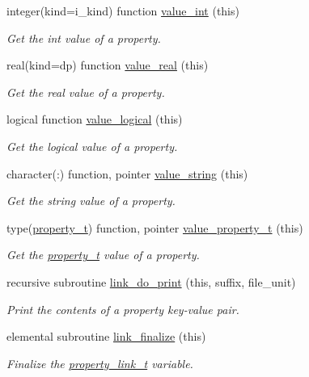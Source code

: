 \begin{DoxyCompactItemize}
integer(kind=i\+\_\+kind) function \mbox{\hyperlink{namespacepmc__property_a5f75da984050d4621460b7530f4edb11}{value\+\_\+int}} (this)
\begin{DoxyCompactList}\small\item\em Get the int value of a property. \end{DoxyCompactList}\item 
real(kind=dp) function \mbox{\hyperlink{namespacepmc__property_a0ef35a2bc42efede42972be617c65e27}{value\+\_\+real}} (this)
\begin{DoxyCompactList}\small\item\em Get the real value of a property. \end{DoxyCompactList}\item 
logical function \mbox{\hyperlink{namespacepmc__property_a404e309153854ccab86eb10318fcbdcf}{value\+\_\+logical}} (this)
\begin{DoxyCompactList}\small\item\em Get the logical value of a property. \end{DoxyCompactList}\item 
character(\+:) function, pointer \mbox{\hyperlink{namespacepmc__property_ad5dcdbd8450ec28999baff573c4edada}{value\+\_\+string}} (this)
\begin{DoxyCompactList}\small\item\em Get the string value of a property. \end{DoxyCompactList}\item 
type(\mbox{\hyperlink{structpmc__property_1_1property__t}{property\+\_\+t}}) function, pointer \mbox{\hyperlink{namespacepmc__property_a793853ad03f64d47abf8df8d637e53c6}{value\+\_\+property\+\_\+t}} (this)
\begin{DoxyCompactList}\small\item\em Get the \mbox{\hyperlink{structpmc__property_1_1property__t}{property\+\_\+t}} value of a property. \end{DoxyCompactList}\item 
recursive subroutine \mbox{\hyperlink{namespacepmc__property_a4a9f323c08b7fe0a6855eade5aadf018}{link\+\_\+do\+\_\+print}} (this, suffix, file\+\_\+unit)
\begin{DoxyCompactList}\small\item\em Print the contents of a property key-\/value pair. \end{DoxyCompactList}\item 
elemental subroutine \mbox{\hyperlink{namespacepmc__property_a505daf27678273c75919399361b41805}{link\+\_\+finalize}} (this)
\begin{DoxyCompactList}\small\item\em Finalize the \mbox{\hyperlink{structpmc__property_1_1property__link__t}{property\+\_\+link\+\_\+t}} variable. \end{DoxyCompactList}\end{DoxyCompactItemize}


